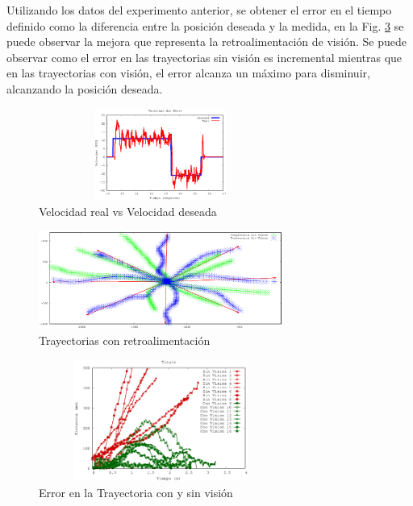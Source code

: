 \documentclass[twocolumn,10pt]{amrob}
\begin{document}
Utilizando los datos del experimento anterior, se obtener el error en el tiempo definido como la diferencia entre la posición deseada y la medida, en la Fig. \ref{fig:errorPlot} se puede observar la mejora que representa la retroalimentación de visión. Se puede observar como el error en las trayectorias sin visión es incremental mientras que en las trayectorias con visión, el error alcanza un máximo para disminuir, alcanzando la posición deseada.


\begin{figure}
  \centering
    \includegraphics[height=3cm,width=8cm]{VelocidadM4.eps}
  \caption{Velocidad real vs Velocidad deseada}
  \label{fig:realVSdes}
\end{figure}
\begin{figure}
  \centering
    \includegraphics[width=8cm]{output1.eps}
  \caption{Trayectorias con retroalimentación}
  \label{fig:visionPruebasRetro}
\end{figure}
\begin{figure}
  \centering
    \includegraphics[height=4cm,width=8cm]{DistErr.eps}
  \caption{Error en la Trayectoria con y sin visión}
  \label{fig:errorPlot}
\end{figure}
\end{document}
